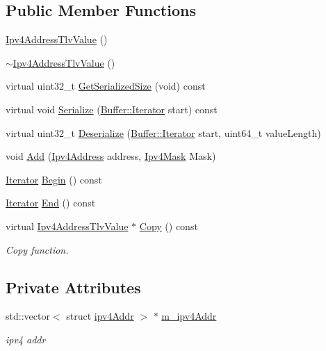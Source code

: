 \subsection*{Public Member Functions}
\begin{DoxyCompactItemize}
\item 
\hyperlink{classns3_1_1Ipv4AddressTlvValue_a886f71acc8111d82109920287c33c688}{Ipv4\+Address\+Tlv\+Value} ()
\item 
\hyperlink{classns3_1_1Ipv4AddressTlvValue_ad6b68c517bacf4b254687eb98f282516}{$\sim$\+Ipv4\+Address\+Tlv\+Value} ()
\item 
virtual uint32\+\_\+t \hyperlink{classns3_1_1Ipv4AddressTlvValue_a47249efa871666daf3ad587f3c1f6fea}{Get\+Serialized\+Size} (void) const 
\item 
virtual void \hyperlink{classns3_1_1Ipv4AddressTlvValue_add2962d80f631055363e993832b091c5}{Serialize} (\hyperlink{classns3_1_1Buffer_1_1Iterator}{Buffer\+::\+Iterator} start) const 
\item 
virtual uint32\+\_\+t \hyperlink{classns3_1_1Ipv4AddressTlvValue_a35e898da16a8767511dc69bad82b7ba9}{Deserialize} (\hyperlink{classns3_1_1Buffer_1_1Iterator}{Buffer\+::\+Iterator} start, uint64\+\_\+t value\+Length)
\item 
void \hyperlink{classns3_1_1Ipv4AddressTlvValue_a9943692fbefad5d0419e0820681bba46}{Add} (\hyperlink{classns3_1_1Ipv4Address}{Ipv4\+Address} address, \hyperlink{classns3_1_1Ipv4Mask}{Ipv4\+Mask} Mask)
\item 
\hyperlink{classns3_1_1Ipv4AddressTlvValue_a459ee680950c4dc60b4962224f6c7992}{Iterator} \hyperlink{classns3_1_1Ipv4AddressTlvValue_a8d74d951f0b0eb19aa4eb326bc0c32c3}{Begin} () const 
\item 
\hyperlink{classns3_1_1Ipv4AddressTlvValue_a459ee680950c4dc60b4962224f6c7992}{Iterator} \hyperlink{classns3_1_1Ipv4AddressTlvValue_a080d2aae10a8a18d7704eed371c52cdd}{End} () const 
\item 
virtual \hyperlink{classns3_1_1Ipv4AddressTlvValue}{Ipv4\+Address\+Tlv\+Value} $\ast$ \hyperlink{classns3_1_1Ipv4AddressTlvValue_a252819f734a9e1765925d0147cc9ade9}{Copy} () const 
\begin{DoxyCompactList}\small\item\em Copy function. \end{DoxyCompactList}\end{DoxyCompactItemize}
\subsection*{Private Attributes}
\begin{DoxyCompactItemize}
\item 
std\+::vector$<$ struct \hyperlink{structns3_1_1Ipv4AddressTlvValue_1_1ipv4Addr}{ipv4\+Addr} $>$ $\ast$ \hyperlink{classns3_1_1Ipv4AddressTlvValue_a2236e0df99e865a6d3afb0ed13b7cb1a}{m\+\_\+ipv4\+Addr}
\begin{DoxyCompactList}\small\item\em ipv4 addr \end{DoxyCompactList}\end{DoxyCompactItemize}



